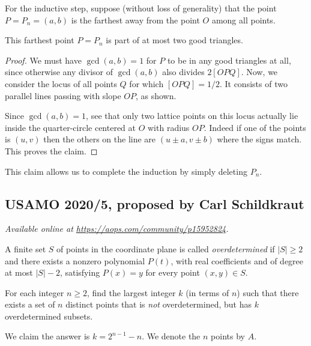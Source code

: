 \documentclass[11pt]{scrartcl}
\begin{document}
For the inductive step,
suppose (without loss of generality) that the point $P = P_n = (a,b)$
is the farthest away from the point $O$ among all points.
\begin{claim*}
  This farthest point $P = P_n$ is part of at most two good triangles.
\end{claim*}
\begin{proof}
  We must have $\gcd(a,b) = 1$ for $P$ to be in any good triangles at all,
  since otherwise any divisor of $\gcd(a,b)$ also divides $2[OPQ]$.
  Now, we consider the locus of all points $Q$ for which $[OPQ] = 1/2$.
  It consists of two parallel lines passing with slope $OP$, as shown.
  \begin{center}
  \end{center}
  Since $\gcd(a,b)=1$, see that only two lattice points on this locus
  actually lie inside the quarter-circle centered at $O$ with radius $OP$.
  Indeed if one of the points is $(u,v)$
  then the others on the line are $(u \pm a, v \pm b)$ where the signs match.
  This proves the claim.
\end{proof}
This claim allows us to complete the induction by simply deleting $P_n$.
\pagebreak

\subsection{USAMO 2020/5, proposed by Carl Schildkraut}
\textsl{Available online at \url{https://aops.com/community/p15952824}.}
\begin{mdframed}[style=mdpurplebox,frametitle={Problem statement}]
A finite set $S$ of points in the coordinate plane
is called \emph{overdetermined} if $|S| \ge 2$
and there exists a nonzero polynomial $P(t)$,
with real coefficients and of degree at most $|S|-2$,
satisfying $P(x)=y$ for every point $(x,y) \in S$.

For each integer $n \ge 2$,
find the largest integer $k$ (in terms of $n$) such that
there exists a set of $n$ distinct points
that is \emph{not} overdetermined,
but has $k$ overdetermined subsets.
\end{mdframed}
We claim the answer is $k = 2^{n-1}-n$.
We denote the $n$ points by $A$.
\end{document}

